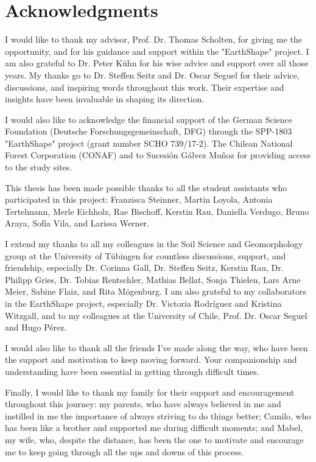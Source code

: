 \chapter*{Acknowledgments}

I would like to thank my advisor, Prof. Dr. Thomas Scholten, for giving me the opportunity, and for his guidance and support within the "EarthShape" project. I am also grateful to Dr. Peter Kühn for his wise advice and support over all those years. My thanks go to Dr. Steffen Seitz and Dr. Oscar Seguel for their advice, discussions, and inspiring words throughout this work. Their expertise and insights have been invaluable in shaping its direction.

I would also like to acknowledge the financial support of the German Science Foundation (Deutsche Forschungsgemeinschaft, DFG) through the SPP-1803 "EarthShape" project (grant number SCHO 739/17-2). The Chilean National Forest Corporation (CONAF) and to Sucesión Gálvez Muñoz for providing access to the study sites.

This thesis has been made possible thanks to all the student assistants who participated in this project: Franzisca Steinner, Martin Loyola, Antonia Tertelmann, Merle Eichholz, Rae Bischoff, Kerstin Rau, Daniella Verdugo, Bruno Araya, Sofía Vila, and Larissa Werner.

I extend my thanks to all my colleagues in the Soil Science and Geomorphology group at the University of Tübingen for countless discussions, support, and friendship, especially Dr. Corinna Gall, Dr. Steffen Seitz, Kerstin Rau, Dr. Philipp Gries, Dr. Tobias Rentschler, Mathias Bellat, Sonja Thielen, Lars Arne Meier, Sabine Flaiz, and Rita Mögenburg. I am also grateful to my collaborators in the EarthShape project, especially Dr. Victoria Rodríguez and Kristina Witzgall, and to my colleagues at the University of Chile, Prof. Dr. Oscar Seguel and Hugo Pérez.

I would also like to thank all the friends I've made along the way, who have been the support and motivation to keep moving forward. Your companionship and understanding have been essential in getting through difficult times.

Finally, I would like to thank my family for their support and encouragement throughout this journey: my parents, who have always believed in me and instilled in me the importance of always striving to do things better; Camilo, who has been like a brother and supported me during difficult moments; and Mabel, my wife, who, despite the distance, has been the one to motivate and encourage me to keep going through all the ups and downs of this process.
